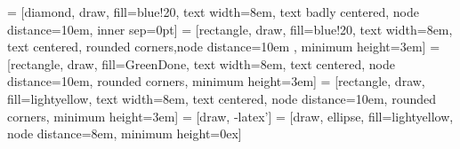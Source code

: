  
 
       = [diamond, draw, fill=blue!20, text width=8em, text badly centered, node distance=10em, inner sep=0pt]
       = [rectangle, draw, fill=blue!20, text width=8em, text centered, rounded corners,node distance=10em ,  minimum height=3em]
       = [rectangle, draw, fill=GreenDone, text width=8em, text centered, node distance=10em, rounded corners, minimum height=3em]
       = [rectangle, draw, fill=lightyellow, text width=8em, text centered, node distance=10em, rounded corners, minimum height=3em]
       = [draw, -latex']
       = [draw, ellipse, fill=lightyellow, node distance=8em, minimum height=0ex]

